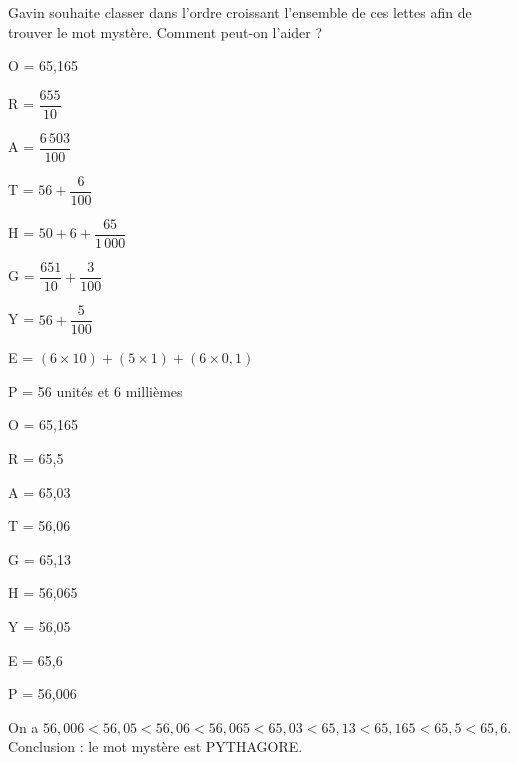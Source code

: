 \begin{colonne*exercice}
\begin{exercice} %
   Gavin souhaite classer dans l'ordre croissant l'ensemble de ces lettes afin de trouver le mot mystère. Comment peut-on l'aider ? \smallskip
   \begin{colitemize}{3}
      \item O = 65,165
      \item R = $\dfrac{655}{10}$
      \item A = $\dfrac{6\,503}{100}$
   \end{colitemize}
   \begin{colitemize}{2}
      \item T = $56+\dfrac{6}{100}$
      \item H = $50+6+\dfrac{65}{1\,000}$
      \item G = $\dfrac{651}{10}+\dfrac{3}{100}$
      \item Y = $56+\dfrac{5}{100}$
   \end{colitemize}
   \begin{colitemize}{1}
      \item E = $(6\times10)+(5\times1)+(6\times0,1)$
      \item P = 56 unités et 6 millièmes
   \end{colitemize}
\end{exercice}

\begin{corrige}
   \begin{colitemize}{3}
      \item \blue O = 65,165 \smallskip
      \item \blue R = 65,5 \smallskip
      \item \blue A = 65,03 \medskip
      \item \blue T = 56,06
      \item \blue G = 65,13
      \item \blue H = 56,065
      \item \blue Y = 56,05
      \item \blue E = 65,6
      \item \blue P = 56,006
   \end{colitemize}
   On a {\blue $56,006 < 56,05 < 56,06 < 56,065 < 65,03 < 65,13 < 65,165 < 65,5 < 65,6$}. \\
   Conclusion : le mot mystère est \blue PYTHAGORE. \\
\end{corrige}

\bigskip




\end{colonne*exercice}
